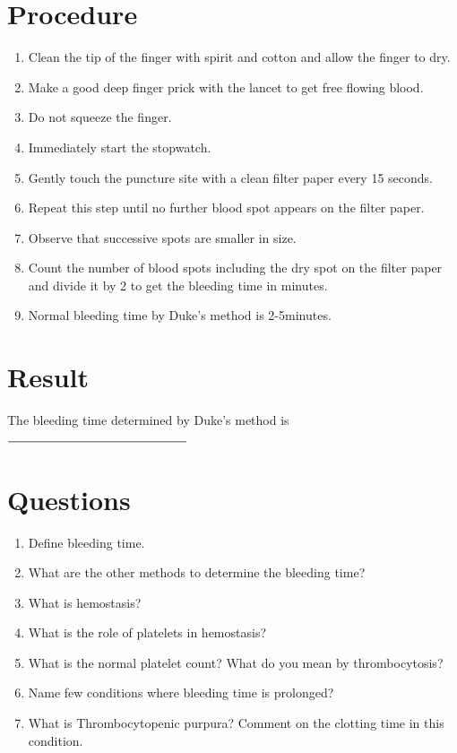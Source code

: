\documentclass[a4paper,12pt,openany,oneside]{book}
\begin{document}
										\section*{Procedure}
										\begin{enumerate}
											\item{Clean the tip of the finger with spirit and cotton and allow the finger to dry.}
											\item{Make a good deep finger prick with the lancet to get free flowing blood.}
											\item{Do not squeeze the finger.}
											\item{Immediately start the stopwatch.}
											\item{Gently touch the puncture site with a clean filter paper every 15 seconds.}
											\item{Repeat this step until no further blood spot appears on the filter paper.}
											\item{Observe that successive spots are smaller in size.}
											\item{Count the number of blood spots including the dry spot on the filter paper and divide it by 2 to get the bleeding time in minutes.}
											\item{Normal bleeding time by Duke’s method is 2-5minutes.}
										\end{enumerate}
										\section*{Result}
										The bleeding time determined by Duke’s method is $\rule{5cm}{0.5pt}$
										\section*{Questions}
										\begin{enumerate}
											\item{Define bleeding time.}
											\item{What are the other methods to determine the bleeding time?}
											\item{What is hemostasis?}
											\item{What is the role of platelets in hemostasis?}
											\item{What is the normal platelet count? What do you mean by thrombocytosis?}
											\item{Name few conditions where bleeding time is prolonged?}
											\item{What is Thrombocytopenic purpura? Comment on the clotting time in this condition.}
										\end{enumerate}
\end{document}
